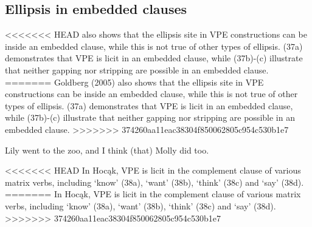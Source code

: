 \documentclass[output=paper]{LSP/langsci}
\begin{document}
\begin{exe}
\begin{xlist}
\end{xlist}
\end{exe}

\subsection{Ellipsis in embedded clauses}

<<<<<<< HEAD
\citet{Goldberg2005} also shows that the ellipsis site in VPE constructions can be inside an embedded clause, while this is not true of other types of ellipsis. (37a) demonstrates that VPE is licit in an embedded clause, while (37b)-(c) illustrate that neither gapping nor stripping are possible in an embedded clause.
=======
Goldberg (2005) also shows that the ellipsis site in VPE constructions can be inside an embedded clause, while this is not true of other types of ellipsis. (37a) demonstrates that VPE is licit in an embedded clause, while (37b)-(c) illustrate that neither gapping nor stripping are possible in an embedded clause.
>>>>>>> 374260aa11eac38304f850062805c954c530b1e7

\begin{exe}
\ex
\begin{xlist}
\ex
Lily went to the zoo, and I think (that) Molly did too.
\end{xlist}
\end{exe}

<<<<<<< HEAD
In Hocąk, VPE is licit in the complement clause of various matrix verbs, including `know' (38a), `want' (38b), `think' (38c) and `say' (38d).
=======
In Hoc\k{a}k, VPE is licit in the complement clause of various matrix verbs, including `know' (38a), `want' (38b), `think' (38c) and `say' (38d).
>>>>>>> 374260aa11eac38304f850062805c954c530b1e7
\end{document}
